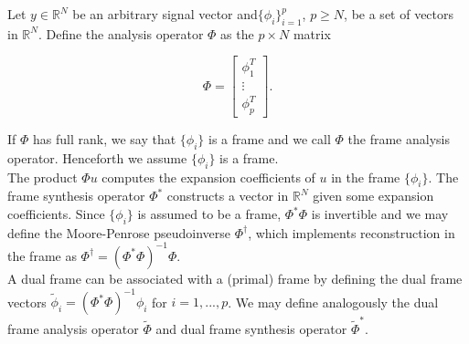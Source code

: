 \documentclass[journal]{IEEEtran}
\newcommand{\reals}{\mathbb{R}}
\begin{document}
Let $y\in\reals^N$ be an arbitrary signal vector and$\{\phi_i\}_{i=1}^p$, $p\ge N$, be a set of vectors in $\reals^N$.  Define the analysis operator $\Phi$ as the $p\times N$ matrix

\[ \Phi = \begin{bmatrix}\phi_1^T\\\vdots\\\phi_p^T\end{bmatrix}. \] 

   \noindent If $\Phi$ has full rank, we say that $\{\phi_i\}$ is a frame and we call $\Phi$ the frame analysis operator.  Henceforth we assume $\{\phi_i\}$ is a frame.\\
   
   The product $\Phi u$ computes the expansion coefficients of $u$ in the frame $\{\phi_i\}$.  The frame synthesis operator $\Phi^\ast$ constructs a vector in $\reals^N$ given some expansion coefficients.  Since $\{\phi_i\}$ is assumed to be a frame, $\Phi^\ast\Phi$ is invertible and we may define the Moore-Penrose pseudoinverse $\Phi^\dagger$, which implements reconstruction in the frame as $\Phi^\dagger=\left(\Phi^\ast\Phi\right)^{-1}\Phi$.\\

   A dual frame can be associated with a (primal) frame by defining the dual frame vectors $\tilde{\phi}_i = \left(\Phi^\ast\Phi\right)^{-1}\phi_i$ for $i=1,...,p$.  We may define analogously the dual frame analysis operator $\tilde{\Phi}$ and dual frame synthesis operator $\tilde{\Phi}^\ast$.\\
\end{document}
